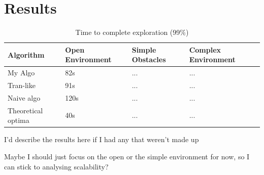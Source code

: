 \documentclass[runningheads]{llncs}
\begin{document}
\newpage
\section{Results}

\begin{table}
\caption{Time to complete exploration (99\%)}\label{tab1}
\begin{tabular}{|l|l|l|l|}
\hline
Algorithm &  Open Environment & Simple Obstacles & Complex Environment\\
\hline
My Algo             & 82s  & ... & ...\\
Tran-like           & 91s  & ... & ...\\
Naive algo          & 120s & ... & ...\\
Theoretical optima  & 40s  & ... & ...\\
\hline
\end{tabular}
\end{table}

I'd describe the results here if I had any that weren't made up


Maybe I should just focus on the open or the simple environment for now, so I can stick to analysing scalability?




\end{document}
